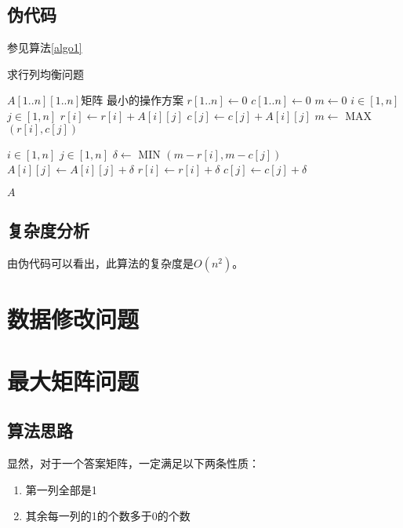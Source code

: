 \documentclass[UTF8]{ctexart}
\begin{document}
    \subsection*{伪代码}
    参见算法\ref{algo1}

    \begin{algorithm}
        \caption{求行列均衡问题}
        \begin{algorithmic}[1]
            \Require $A[1..n][1..n]$矩阵
            \Ensure 最小的操作方案
                \State $r[1..n] \gets 0$
                \State $c[1..n] \gets 0$
                \State $m \gets 0$
                \For $i \in [1, n]$
                    \For $j \in [1, n]$
                        \State $r[i] \gets r[i] + A[i][j]$
                        \State $c[j] \gets c[j] + A[i][j]$
                        \State $m \gets$ MAX $(r[i], c[j])$
                    \EndFor
                \EndFor

                \For $i \in [1, n]$
                    \For $j \in [1, n]$
                        \State $\delta \gets$ MIN $(m - r[i], m - c[j])$
                        \State $A[i][j] \gets A[i][j] + \delta$
                        \State $r[i] \gets r[i] + \delta$
                        \State $c[j] \gets c[j] + \delta$
                    \EndFor
                \EndFor

                \State \Return $A$
            \EndFunction
    
        \end{algorithmic}
        \label{algo1}
    \end{algorithm}

    \subsection*{复杂度分析}
    由伪代码可以看出，此算法的复杂度是$O(n^2)$。

\section{数据修改问题} %
    

\section{最大矩阵问题} %
    \subsection*{算法思路}
        显然，对于一个答案矩阵，一定满足以下两条性质：
        \begin{enumerate}
            \item 第一列全部是1
            \item 其余每一列的1的个数多于0的个数
        \end{enumerate}
\end{document}
